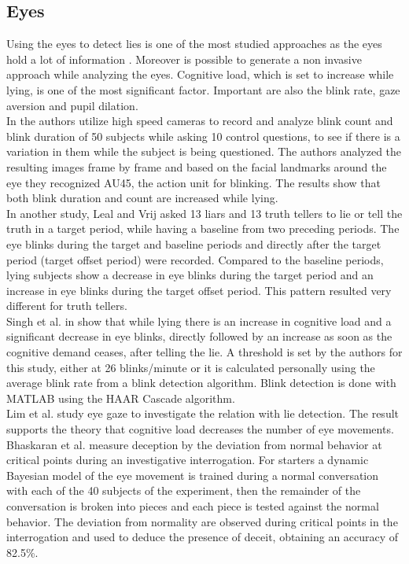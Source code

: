 \subsection*{Eyes}
Using the eyes to detect lies is one of the most studied approaches as the eyes hold a lot of information \cite{FUKUDA2001239}. Moreover is possible to generate a non invasive approach while analyzing the eyes. Cognitive load, which is set to increase while lying, is one of the most significant factor. Important are also the blink rate, gaze aversion and pupil dilation.\\
In \cite{8125844} the authors utilize high speed cameras to record and analyze blink count and blink duration of 50 subjects while asking 10 control questions, to see if there is a variation in them while the subject is being questioned. The authors analyzed the resulting images frame by frame and based on the facial landmarks around the eye they recognized AU45, the action unit for blinking. The results show that both blink duration and count are increased while lying.\\
In another study, Leal and Vrij \cite{Leal2008} asked 13 liars and 13 truth tellers to lie or tell the truth in a target period, while having a baseline from two preceding periods. The eye blinks during the target and baseline periods and directly after the target period (target offset period) were recorded. Compared to the baseline periods, lying subjects show a decrease in eye blinks during the target period and an increase in eye blinks during the target offset period. This pattern resulted very different for truth tellers. \\
Singh et al. in \cite{7324092} show that while lying there is an increase in cognitive load and a significant decrease in eye blinks, directly followed by an increase as soon as the cognitive demand ceases, after telling the lie. A threshold is set by the authors for this study, either at 26 blinks/minute or it is calculated personally using the average blink rate from a blink detection algorithm. Blink detection is done with MATLAB using the HAAR Cascade algorithm. \\
Lim et al. study eye gaze \cite{Lim:2013:LTE:2535948.2535954} to investigate the relation with lie detection. The result supports the theory that cognitive load decreases the number of eye movements.\\
Bhaskaran et al. measure deception by the deviation from normal behavior \cite{5771407} at critical points during an investigative interrogation. For starters a dynamic Bayesian model of the eye movement is trained during a normal conversation with each of the 40 subjects of the experiment, then the remainder of the conversation is broken into pieces and each piece is tested against the normal behavior. The deviation from normality are observed during critical points in the interrogation and used to deduce the presence of deceit, obtaining an accuracy of 82.5\%. \\
